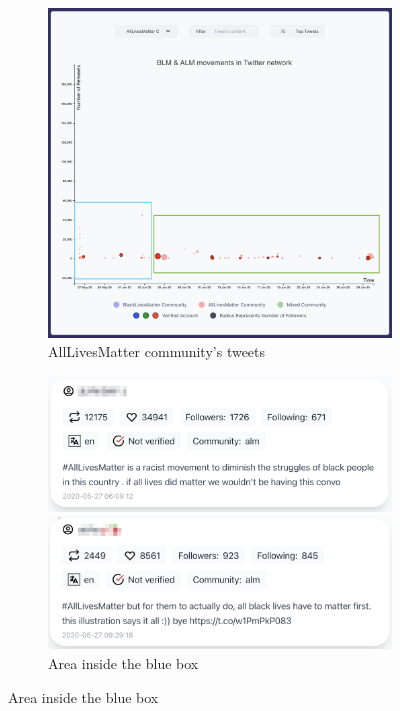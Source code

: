 \begin{figure}[H]

\begin{subfigure}{.45\textwidth}
  \centering
  \captionsetup{justification=centering}
  \includegraphics[width=1\linewidth]{./pics/obser1.png}  
  \caption{AllLivesMatter community's tweets}
  \label{fig:sub-first-almcts}
\end{subfigure}
\begin{subfigure}{.45\textwidth}
  \centering
  \captionsetup{justification=centering}
  \includegraphics[width=0.9\linewidth]{./pics/obser2.png}
  
  \includegraphics[width=0.9\linewidth]{./pics/obser3.png}
  \caption{Area inside the blue box}
  \label{fig:sub-second-aibb}
\end{subfigure}


\end{figure}
